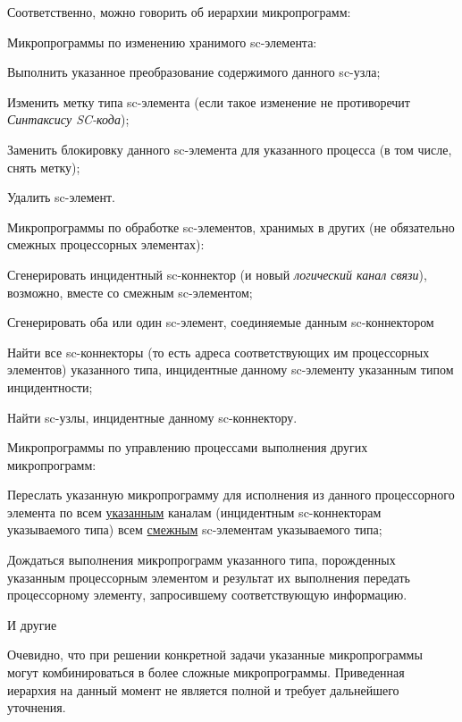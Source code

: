 Соответственно, можно говорить об иерархии микропрограмм:
\begin{textitemize}
	\item Микропрограммы по изменению хранимого sc-элемента:
	\begin{textitemize}
		\item Выполнить указанное преобразование содержимого данного sc-узла;
		\item Изменить метку типа sc-элемента (если такое изменение не противоречит \textit{Синтаксису SC-кода});
		\item Заменить блокировку данного sc-элемента для указанного процесса (в том числе, снять метку);
		\item Удалить sc-элемент.
	\end{textitemize}
	\item Микропрограммы по обработке sc-элементов, хранимых в других (не обязательно смежных процессорных элементах):
	\begin{textitemize}
		\item Сгенерировать инцидентный sc-коннектор (и новый \textit{логический канал связи}), возможно, вместе со смежным sc-элементом;
		\item Сгенерировать оба или один sc-элемент, соединяемые данным sc-коннектором
		\item Найти все sc-коннекторы (то есть адреса соответствующих им процессорных элементов) указанного типа, инцидентные данному sc-элементу указанным типом инцидентности;
		\item Найти sc-узлы, инцидентные данному sc-коннектору.
	\end{textitemize}
	\item Микропрограммы по управлению процессами выполнения других микропрограмм:
	\begin{textitemize}
		\item Переслать указанную микропрограмму для исполнения из данного процессорного элемента по всем \underline{указанным} каналам (инцидентным sc-коннекторам указываемого типа) всем \underline{смежным} sc-элементам указываемого типа;
		\item Дождаться выполнения микропрограмм указанного типа, порожденных указанным процессорным элементом и результат их выполнения передать процессорному элементу, запросившему соответствующую информацию.
	\end{textitemize}
	\item И другие
\end{textitemize}

Очевидно, что при решении конкретной задачи указанные микропрограммы могут комбинироваться в более сложные микропрограммы. Приведенная иерархия на данный момент не является полной и требует дальнейшего уточнения.

